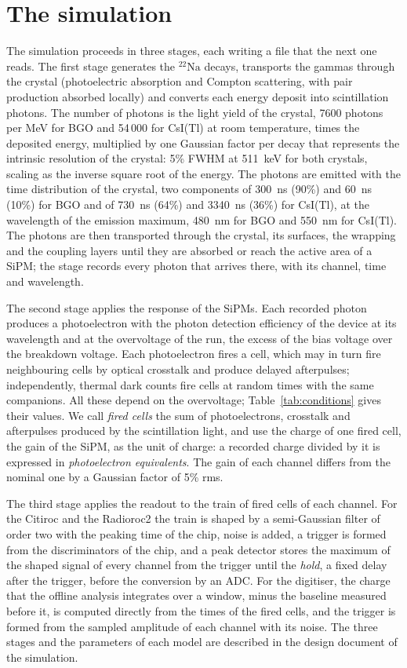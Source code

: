 \documentclass[11pt]{article}
\newcommand{\Na}{\ensuremath{{}^{22}\mathrm{Na}}\xspace}
\newcommand{\csitl}{CsI(Tl)\xspace}
\begin{document}
\section{The simulation}
\label{sec:sim}

The simulation proceeds in three stages, each writing a file that the next
one reads. The first stage generates the \Na decays, transports the gammas
through the crystal (photoelectric absorption and Compton scattering,
with pair production absorbed locally) and converts each energy deposit into scintillation photons.
The number of photons is the light yield of the crystal, 7600 photons per
MeV for BGO and 54\,000 for \csitl at room temperature, times the
deposited energy, multiplied by one Gaussian factor per decay that
represents the intrinsic resolution of the crystal: 5\% FWHM at 511~keV for
both crystals, scaling as the inverse square root of the energy. The
photons are emitted with the time distribution of the crystal, two components of
300~ns (90\%) and 60~ns (10\%) for BGO and of 730~ns
(64\%) and 3340~ns (36\%) for \csitl, at the wavelength of the emission
maximum, 480~nm for BGO and 550~nm for \csitl. The photons are then transported through the crystal,
its surfaces, the wrapping and the coupling layers until they are absorbed
or reach the active area of a SiPM; the stage records every photon that
arrives there, with its channel, time and wavelength.

The second stage applies the response of the SiPMs. Each recorded photon
produces a photoelectron with the photon detection efficiency of the
device at its wavelength and at the overvoltage of the run, the excess of
the bias voltage over the breakdown voltage. Each photoelectron fires a
cell, which may in turn fire neighbouring cells by optical crosstalk and
produce delayed afterpulses; independently, thermal dark counts fire cells
at random times with the same companions. All these depend on the
overvoltage; Table~\ref{tab:conditions} gives their values. We call
\emph{fired cells} the sum of photoelectrons, crosstalk and afterpulses
produced by the scintillation light, and use the charge of one fired cell,
the gain of the SiPM, as the unit of charge: a recorded charge divided by
it is expressed in \emph{photoelectron equivalents}. The gain of each
channel differs from the nominal one by a Gaussian factor of 5\% rms.

The third stage applies the readout to the train of fired cells of each
channel. For the Citiroc and the Radioroc2 the train is shaped by a
semi-Gaussian filter of order two with the peaking time of the chip,
noise is added, a trigger is formed from the discriminators of the chip,
and a peak detector stores the maximum of the shaped signal of every
channel from the trigger until the \emph{hold}, a fixed delay after the
trigger, before the conversion by an ADC. For the digitiser, the charge
that the offline analysis integrates over a window, minus the baseline
measured before it, is computed directly from the times of the fired
cells, and the trigger is formed from the sampled amplitude of each
channel with its noise. The three stages and the parameters of each model
are described in the design document of the simulation.
\end{document}
